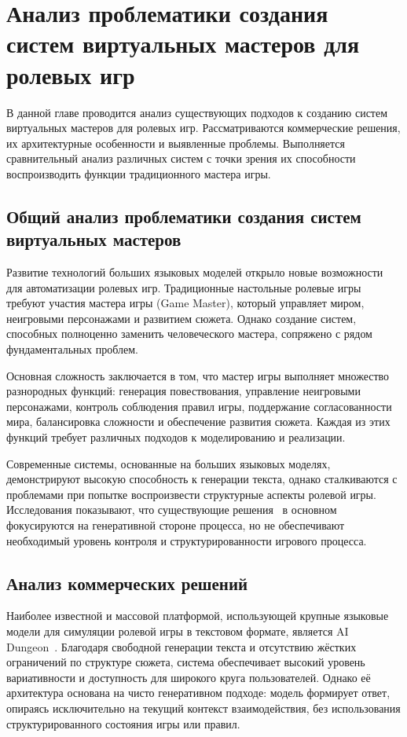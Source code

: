 \chapter{Анализ проблематики создания систем виртуальных мастеров для ролевых игр}
\label{chapter1}

В данной главе проводится анализ существующих подходов к созданию систем виртуальных мастеров для ролевых игр. Рассматриваются коммерческие решения, их архитектурные особенности и выявленные проблемы. Выполняется сравнительный анализ различных систем с точки зрения их способности воспроизводить функции традиционного мастера игры.

\section{Общий анализ проблематики создания систем виртуальных мастеров}

Развитие технологий больших языковых моделей открыло новые возможности для автоматизации ролевых игр. Традиционные настольные ролевые игры требуют участия мастера игры (Game Master), который управляет миром, неигровыми персонажами и развитием сюжета. Однако создание систем, способных полноценно заменить человеческого мастера, сопряжено с рядом фундаментальных проблем.

Основная сложность заключается в том, что мастер игры выполняет множество разнородных функций: генерация повествования, управление неигровыми персонажами, контроль соблюдения правил игры, поддержание согласованности мира, балансировка сложности и обеспечение развития сюжета. Каждая из этих функций требует различных подходов к моделированию и реализации.

Современные системы, основанные на больших языковых моделях, демонстрируют высокую способность к генерации текста, однако сталкиваются с проблемами при попытке воспроизвести структурные аспекты ролевой игры. Исследования показывают, что существующие решения~\cite{Zhou2022,Jorgensen2025,Zhu2023,Santiago2023,CallisonBurch2022} в основном фокусируются на генеративной стороне процесса, но не обеспечивают необходимый уровень контроля и структурированности игрового процесса.

\section{Анализ коммерческих решений}

Наиболее известной и массовой платформой, использующей крупные языковые модели для симуляции ролевой игры в текстовом формате, является AI Dungeon~\cite{AIDungeon}. Благодаря свободной генерации текста и отсутствию жёстких ограничений по структуре сюжета, система обеспечивает высокий уровень вариативности и доступность для широкого круга пользователей. Однако её архитектура основана на чисто генеративном подходе: модель формирует ответ, опираясь исключительно на текущий контекст взаимодействия, без использования структурированного состояния игры или правил.


